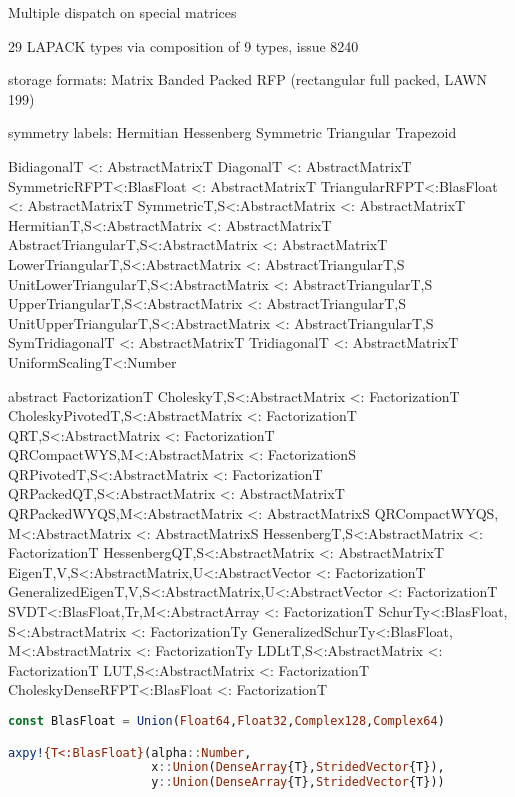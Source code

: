 Multiple dispatch on special matrices

29 LAPACK types via composition of 9 types, issue 8240

storage formats:
Matrix
Banded
Packed
RFP (rectangular full packed, LAWN 199)

symmetry labels:
Hermitian
Hessenberg
Symmetric
Triangular
Trapezoid

Bidiagonal{T} <: AbstractMatrix{T}
Diagonal{T} <: AbstractMatrix{T}
SymmetricRFP{T<:BlasFloat} <: AbstractMatrix{T}
TriangularRFP{T<:BlasFloat} <: AbstractMatrix{T}
Symmetric{T,S<:AbstractMatrix} <: AbstractMatrix{T}
Hermitian{T,S<:AbstractMatrix} <: AbstractMatrix{T}
AbstractTriangular{T,S<:AbstractMatrix} <: AbstractMatrix{T}
LowerTriangular{T,S<:AbstractMatrix} <: AbstractTriangular{T,S}
UnitLowerTriangular{T,S<:AbstractMatrix} <: AbstractTriangular{T,S}
UpperTriangular{T,S<:AbstractMatrix} <: AbstractTriangular{T,S}
UnitUpperTriangular{T,S<:AbstractMatrix} <: AbstractTriangular{T,S}
SymTridiagonal{T} <: AbstractMatrix{T}
Tridiagonal{T} <: AbstractMatrix{T}
UniformScaling{T<:Number}

abstract Factorization{T}
Cholesky{T,S<:AbstractMatrix} <: Factorization{T}
CholeskyPivoted{T,S<:AbstractMatrix} <: Factorization{T}
QR{T,S<:AbstractMatrix} <: Factorization{T}
QRCompactWY{S,M<:AbstractMatrix} <: Factorization{S}
QRPivoted{T,S<:AbstractMatrix} <: Factorization{T}
QRPackedQ{T,S<:AbstractMatrix} <: AbstractMatrix{T}
QRPackedWYQ{S,M<:AbstractMatrix} <: AbstractMatrix{S}
QRCompactWYQ{S, M<:AbstractMatrix} <: AbstractMatrix{S}
Hessenberg{T,S<:AbstractMatrix} <: Factorization{T}
HessenbergQ{T,S<:AbstractMatrix} <: AbstractMatrix{T}
Eigen{T,V,S<:AbstractMatrix,U<:AbstractVector} <: Factorization{T}
GeneralizedEigen{T,V,S<:AbstractMatrix,U<:AbstractVector} <: Factorization{T}
SVD{T<:BlasFloat,Tr,M<:AbstractArray} <: Factorization{T}
Schur{Ty<:BlasFloat, S<:AbstractMatrix} <: Factorization{Ty}
GeneralizedSchur{Ty<:BlasFloat, M<:AbstractMatrix} <: Factorization{Ty}
LDLt{T,S<:AbstractMatrix} <: Factorization{T}
LU{T,S<:AbstractMatrix} <: Factorization{T}
CholeskyDenseRFP{T<:BlasFloat} <: Factorization{T}


\begin{singlespace}
\begin{lstlisting}[language=julia]
const BlasFloat = Union(Float64,Float32,Complex128,Complex64)

axpy!{T<:BlasFloat}(alpha::Number,
                    x::Union(DenseArray{T},StridedVector{T}),
                    y::Union(DenseArray{T},StridedVector{T}))
\end{lstlisting}
\end{singlespace}




